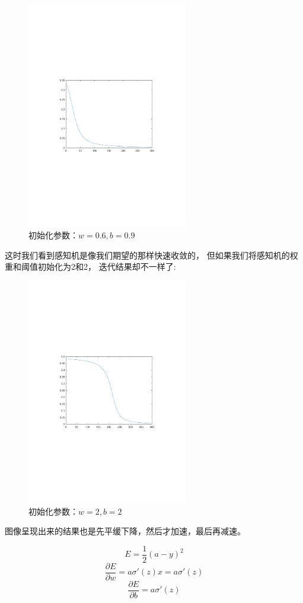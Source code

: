 \begin{figure}[H]
\centering
\includegraphics[width=7cm]{fig/test1.pdf}
\caption{初始化参数：$w=0.6,b=0.9$}
\end{figure}
这时我们看到感知机是像我们期望的那样快速收敛的，
但如果我们将感知机的权重和阈值初始化为2和2，
迭代结果却不一样了:

\begin{figure}[H]
\centering
\includegraphics[width=7cm]{fig/test2.pdf}
\caption{初始化参数：$w=2,b=2$}
\end{figure}

图像呈现出来的结果也是先平缓下降，然后才加速，最后再减速。


\[E = \frac{1}{2}({a} - y)^2 \]
\begin{equation}
\frac{{\partial E}}{{\partial {w}}} = {a}\sigma'({z})x={a}\sigma'({z}) \label{dw1}
\end{equation}
\begin{equation}
\frac{{\partial E}}{{\partial {b}}} = a\sigma'({z}) \label{db1}
\end{equation}

